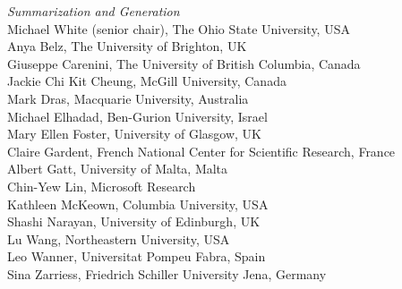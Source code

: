 \emph{Summarization and Generation} \\
\hspace*{0.2in}Michael White (senior chair), The Ohio State University, USA \\
\hspace*{0.2in}Anya Belz, The University of Brighton, UK \\
\hspace*{0.2in}Giuseppe Carenini, The University of British Columbia, Canada \\
\hspace*{0.2in}Jackie Chi Kit Cheung, McGill University, Canada \\
\hspace*{0.2in}Mark Dras, Macquarie University, Australia \\
\hspace*{0.2in}Michael Elhadad, Ben-Gurion University, Israel \\
\hspace*{0.2in}Mary Ellen Foster, University of Glasgow, UK \\
\hspace*{0.2in}Claire Gardent, French National Center for Scientific Research, France \\
\hspace*{0.2in}Albert Gatt, University of Malta, Malta \\
\hspace*{0.2in}Chin-Yew Lin, Microsoft Research \\
\hspace*{0.2in}Kathleen McKeown, Columbia University, USA \\
\hspace*{0.2in}Shashi Narayan, University of Edinburgh, UK \\
\hspace*{0.2in}Lu Wang, Northeastern University, USA \\
\hspace*{0.2in}Leo Wanner, Universitat Pompeu Fabra, Spain \\
\hspace*{0.2in}Sina Zarriess, Friedrich Schiller University Jena, Germany

\clearpage

